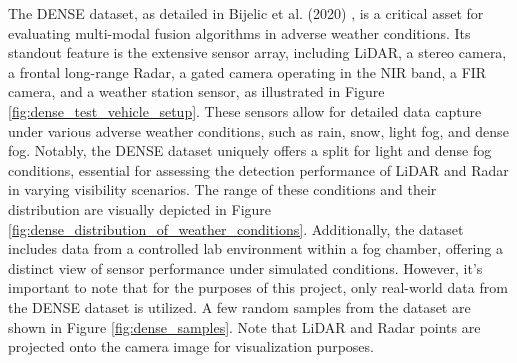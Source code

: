 \documentclass[report.tex]{subfiles}
\begin{document}
    The DENSE dataset, as detailed in Bijelic et al. (2020) \cite{bijelic2020seeing}, is a critical asset for evaluating multi-modal fusion algorithms in adverse weather conditions. Its standout feature is the extensive sensor array, including LiDAR, a stereo camera, a frontal long-range Radar, a gated camera operating in the NIR band, a FIR camera, and a weather station sensor, as illustrated in Figure \ref{fig:dense_test_vehicle_setup}. These sensors allow for detailed data capture under various adverse weather conditions, such as rain, snow, light fog, and dense fog. Notably, the DENSE dataset uniquely offers a split for light and dense fog conditions, essential for assessing the detection performance of LiDAR and Radar in varying visibility scenarios. The range of these conditions and their distribution are visually depicted in Figure \ref{fig:dense_distribution_of_weather_conditions}. Additionally, the dataset includes data from a controlled lab environment within a fog chamber, offering a distinct view of sensor performance under simulated conditions. However, it's important to note that for the purposes of this project, only real-world data from the DENSE dataset is utilized. A few random samples from the dataset are shown in Figure \ref{fig:dense_samples}. Note that LiDAR and Radar points are projected onto the camera image for visualization purposes.
\end{document}
